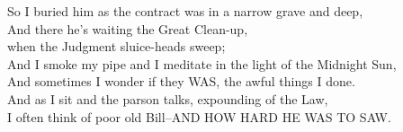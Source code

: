 \begin{poemblock}
So I buried him as the contract was in a narrow grave and deep,\\
And there he's waiting the Great Clean-up,\\
\idt when the Judgment sluice-heads sweep;\\
And I smoke my pipe and I meditate in the light of the Midnight Sun,\\
And sometimes I wonder if they WAS, the awful things I done.\\
And as I sit and the parson talks, expounding of the Law,\\
I often think of poor old Bill--AND HOW HARD HE WAS TO SAW.
\end{poemblock}
